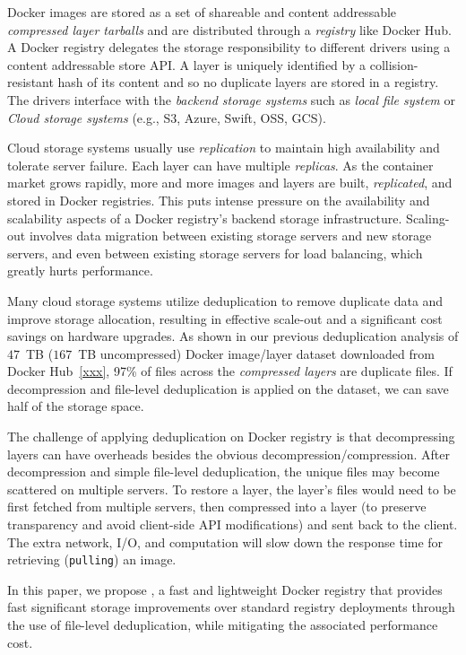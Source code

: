 Docker images are stored as a set of shareable and content addressable \emph{compressed layer tarballs} 
and are distributed through a \emph{registry} like Docker Hub.
A Docker registry delegates the storage responsibility to different drivers using a content addressable store API.
A layer is uniquely identified by a collision-resistant hash of its content and so no duplicate layers are stored in a registry.
The drivers interface with the \emph{backend storage systems}
such as \emph{local file system} or \emph{Cloud storage systems} (e.g., S3, Azure, Swift, OSS, GCS).

Cloud storage systems usually use \emph{replication} to maintain high availability and tolerate server failure.
Each layer can have multiple \emph{replicas}.
As the container market grows rapidly, 
more and more images and layers are built, \emph{replicated}, and stored in Docker registries.
This puts intense pressure on the availability and scalability aspects of a Docker registry's backend storage infrastructure. 
Scaling-out involves data migration between existing storage servers and new storage servers, 
and even between existing storage servers for load balancing,
which greatly hurts performance.

Many cloud storage systems utilize deduplication to remove duplicate data and improve storage allocation, resulting in
effective scale-out and a significant cost savings on hardware upgrades.
As shown in our previous deduplication analysis of $47$~TB ($167$~TB uncompressed) 
Docker image/layer dataset downloaded from Docker Hub~\ref{xxx},
97\% of files across the \emph{compressed layers} are duplicate files.
If decompression and file-level deduplication is applied on the dataset, %
we can save half of the storage space.

The challenge of applying deduplication on Docker registry 
is that decompressing layers can have overheads besides the obvious decompression/compression. 
After decompression and simple file-level deduplication, 
the unique files may become scattered on
multiple servers. 
To restore a layer,
the layer's files would need to be first fetched from multiple servers, then compressed into a layer (to preserve transparency and avoid client-side API modifications)
and sent back to the client.
The extra network, I/O, and computation will slow down the response time for retrieving (\texttt{pulling}) an image.

In this paper, we propose \sysname, a fast and lightweight Docker registry that 
provides fast  
significant storage improvements over standard registry deployments through the use of file-level deduplication, while mitigating the associated performance cost. 
